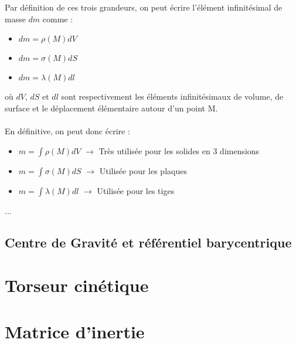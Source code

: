 Par définition de ces trois grandeurs, on peut écrire l'élément infinitésimal de masse $dm$ comme :
\begin{itemize}
    \item $dm=\rho(M)dV$
    \item $dm=\sigma(M)dS$
    \item $dm=\lambda(M)dl$
\end{itemize}
où $dV$, $dS$ et $dl$ sont respectivement les éléments infinitésimaux de volume, de surface et le déplacement élémentaire autour d'un point M.\\
 \\
En définitive, on peut donc écrire :
\begin{itemize}
    \item $m=\int \rho(M)dV$ $\rightarrow$ Très utilisée pour les solides en 3 dimensions
    \item $m=\int \sigma(M)dS$ $\rightarrow$ Utilisée pour les plaques
    \item $m=\int \lambda(M)dl$ $\rightarrow$ Utilisée pour les tiges
\end{itemize}
\begin{ex}
...
\end{ex}
\subsection{Centre de Gravité et référentiel barycentrique}
\section{Torseur cinétique}
\section{Matrice d'inertie}